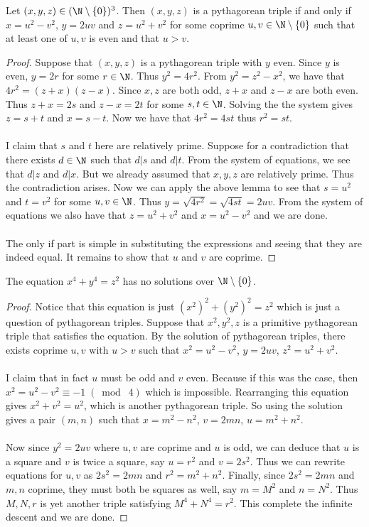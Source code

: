 \begin{thm}{}{} Let $(x,y,z)\in(\N\setminus\{0\})^3$. Then $(x,y,z)$ is a pythagorean triple if and only if $x=u^2-v^2$, $y=2uv$ and $z=u^2+v^2$ for some coprime $u,v\in\N\setminus\{0\}$ such that at least one of $u,v$ is even and that $u>v$. \tcbline
\begin{proof}
Suppose that $(x,y,z)$ is a pythagorean triple with $y$ even. Since $y$ is even, $y=2r$ for some $r\in\N$. Thus $y^2=4r^2$. From $y^2=z^2-x^2$, we have that $4r^2=(z+x)(z-x)$. Since $x,z$ are both odd, $z+x$ and $z-x$ are both even. Thus $z+x=2s$ and $z-x=2t$ for some $s,t\in\N$. Solving the the system gives $z=s+t$ and $x=s-t$. Now we have that $4r^2=4st$ thus $r^2=st$. \\~\\
I claim that $s$ and $t$ here are relatively prime. Suppose for a contradiction that there exists $d\in\N$ such that $d|s$ and $d|t$. From the system of equations, we see that $d|z$ and $d|x$. But we already assumed that $x,y,z$ are relatively prime. Thus the contradiction arises. Now we can apply the above lemma to see that $s=u^2$ and $t=v^2$ for some $u,v\in\N$. Thus $y=\sqrt{4r^2}=\sqrt{4st}=2uv$. From the system of equations we also have that $z=u^2+v^2$ and $x=u^2-v^2$ and we are done. \\~\\
The only if part is simple in substituting the expressions and seeing that they are indeed equal. It remains to show that $u$ and $v$ are coprime. 
\end{proof}
\end{thm}

\begin{thm}{}{} The equation $x^4+y^4=z^2$ has no solutions over $\N\setminus\{0\}$. \tcbline
\begin{proof}
Notice that this equation is just $(x^2)^2+(y^2)^2=z^2$ which is just a question of pythagorean triples. Suppose that $x^2,y^2,z$ is a primitive pythagorean triple that satisfies the equation. By the solution of pythagorean triples, there exists coprime $u,v$ with $u>v$ such that $x^2=u^2-v^2$, $y=2uv$, $z^2=u^2+v^2$. \\~\\
I claim that in fact $u$ must be odd and $v$ even. Because if this was the case, then $x^2=u^2-v^2\equiv -1\;(\bmod\;4)$ which is impossible. Rearranging this equation gives $x^2+v^2=u^2$, which is another pythagorean triple. So using the solution gives a pair $(m,n)$ such that $x=m^2-n^2$, $v=2mn$, $u=m^2+n^2$. \\~\\
Now since $y^2=2uv$ where $u,v$ are coprime and $u$ is odd, we can deduce that $u$ is a square and $v$ is twice a square, say $u=r^2$ and $v=2s^2$. Thus we can rewrite equations for $u,v$ as $2s^2=2mn$ and $r^2=m^2+n^2$. Finally, since $2s^2=2mn$ and $m,n$ coprime, they must both be squares as well, say $m=M^2$ and $n=N^2$. Thus $M,N,r$ is yet another triple satisfying $M^4+N^4=r^2$. This complete the infinite descent and we are done. 
\end{proof}
\end{thm}

